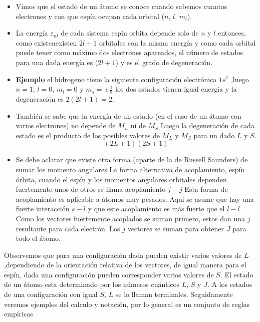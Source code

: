 \begin{itemize}
\item Vimos que el estado de un átomo se conoce cuando sabemos cuantos electrones y con que espín ocupan cada orbital ($n$, $l$, $m_{l}$).

\item La energía $\varepsilon_{nl}$ de cada sistema espín orbita depende solo de $n$ y $l$ entonces, como existenexisten $2l+1$ orbitales con la misma energía y como cada orbital puede tener como máximo dos electrones apareados, el número de estados para una dada energía es ($2l+1$) y es el grado de degeneración.

\item \textbf{Ejemplo} el hidrogeno tiene la siguiente configuración electrónica $1s^{1}$ ,luego $n=1$, $l=0$, $m_{l}=0$ y $m_{s}=\pm \frac{1}{2}$ los dos estados tienen igual energía y la degeneración es $2(2l+1)=2$.

\item También se sabe que la energía de un estado (en el caso de un átomo con varios electrones) no depende de $M_{L}$ ni de $M_{S}$ Luego la degeneración de cada estado es el producto de los posibles valores de $M_{L}$ y $M_{S}$ para un dado $L$ y $S$.
\begin{equation}
	(2L+1)(2S+1)
\end{equation}

\item Se debe aclarar que existe otra forma (aparte de la de Russell Saunders) de sumar los momento angulares La forma alternativa de acoplamiento, espín órbita, cuando el espín y los momentos angulares orbitales dependen fuertemente unos de otros se llama acoplamiento $j-j$ Esta forma de acoplamiento es aplicable a átomos muy pesados. Aqui se  asume que hay una fuerte interacción $s-l$ y que este acoplamiento es más fuerte que el $l-l$ Como los vectores fuertemente acoplados se suman primero, estos dan una $j$ resultante para cada electrón. Los $j$ vectores se suman para obtener $J$ para todo el átomo.
\end{itemize}

Observemos que para una configuración dada pueden existir varios valores de $L$,dependiendo de la orientación relativa de los vectores, de igual manera para el espín, dada una configuración pueden corresponder varios valores de $S$. El estado de un átomo esta determinado por los números cuánticos $L$, $S$ y $J$. A los estados de una configuración con igual $S$, $L$ se lo llaman terminales. Seguidamente veremos ejemplos del calculo y notación, por lo general es un conjunto de reglas empíricas

